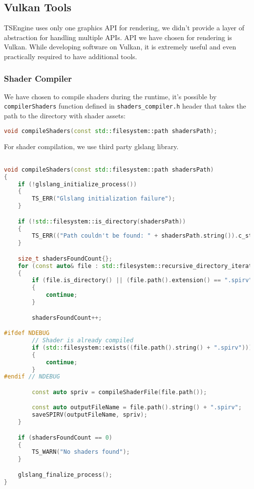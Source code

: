 \newpage
\subsection{Vulkan Tools}
\hspace{\parindent}
TSEngine uses only one graphics API for rendering, we didn't provide a layer of abstraction for handling multiple APIs. API we have chosen for rendering is Vulkan. While developing software on Vulkan, it is extremely useful and even practically required to have additional tools.
\subsubsection{Shader Compiler}
\label{sec:shader_compiler}
\hspace{\parindent}
We have chosen to compile shaders during the runtime, it's possible by \texttt{compilerShaders} function defined in \texttt{shaders\_compiler.h} header that takes the path to the directory with shader assets: 
\begin{lstlisting}[language=c++, caption=Shaders Compiler header (./engine/src/vulkan\_tools/shaders\_compiler.h)]
void compileShaders(const std::filesystem::path shadersPath);
\end{lstlisting}

For shader compilation, we use third party glslang library.
\begin{lstlisting}[language=c++, caption=Shader Compiler implementation(./engine/src/vulkan\_tools/shaders\_compiler.cpp)]

void compileShaders(const std::filesystem::path shadersPath)
{
    if (!glslang_initialize_process())
    {
        TS_ERR("Glslang initialization failure");
    }

    if (!std::filesystem::is_directory(shadersPath))
    {
        TS_ERR(("Path couldn't be found: " + shadersPath.string()).c_str());
    }

    size_t shadersFoundCount{};
    for (const auto& file : std::filesystem::recursive_directory_iterator(shadersPath))
    {
        if (file.is_directory() || (file.path().extension() == ".spirv") || (file.path().extension() == ".h"))
        {
            continue;
        }

        shadersFoundCount++;

#ifdef NDEBUG
        // Shader is already compiled
        if (std::filesystem::exists((file.path().string() + ".spirv")))
        {
            continue;
        }
#endif // NDEBUG

        const auto spriv = compileShaderFile(file.path());

        const auto outputFileName = file.path().string() + ".spirv";
        saveSPIRV(outputFileName, spriv);
    }

    if (shadersFoundCount == 0)
    {
        TS_WARN("No shaders found");
    }

    glslang_finalize_process();
}
\end{lstlisting}
\label{problem_with_shader_compilation}


